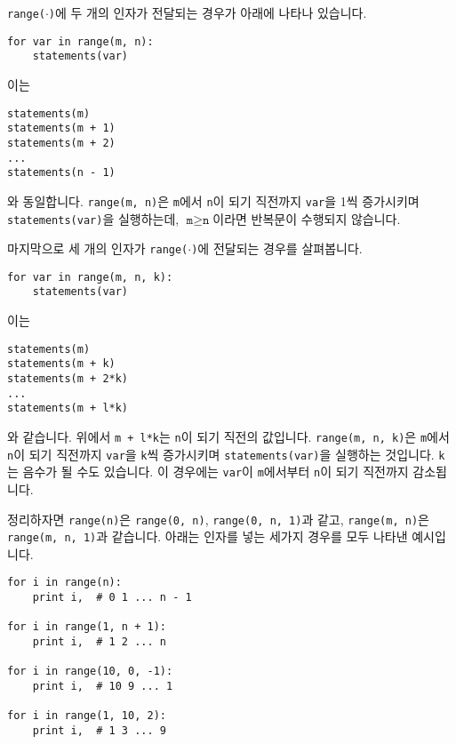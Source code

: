 \documentclass[../main.tex]{subfiles}
\begin{document}
\texttt{range($\cdot$)}에 두 개의 인자가 전달되는 경우가 아래에 나타나 있습니다.
\begin{verbatim}
for var in range(m, n):
	statements(var)
\end{verbatim}
이는 
\begin{verbatim}
statements(m)
statements(m + 1)
statements(m + 2)
...
statements(n - 1)
\end{verbatim}
와 동일합니다.
\texttt{range(m, n)}은 \texttt{m}에서 \texttt{n}이 되기 직전까지 \texttt{var}을 1씩 증가시키며 \texttt{statements(var)}을 실행하는데, $\texttt{m} \geq \texttt{n}$이라면 반복문이 수행되지 않습니다.

마지막으로 세 개의 인자가 \texttt{range($\cdot$)}에 전달되는 경우를 살펴봅니다.
\begin{verbatim}
for var in range(m, n, k):
	statements(var)
\end{verbatim}
이는
\begin{verbatim}
statements(m)
statements(m + k)
statements(m + 2*k)
...
statements(m + l*k)
\end{verbatim}
와 같습니다.
위에서 \texttt{m + l*k}는 \texttt{n}이 되기 직전의 값입니다.
\texttt{range(m, n, k)}은 \texttt{m}에서 \texttt{n}이 되기 직전까지 \texttt{var}을 \texttt{k}씩 증가시키며 \texttt{statements(var)}을 실행하는 것입니다.
\texttt{k}는 음수가 될 수도 있습니다.
이 경우에는 \texttt{var}이 \texttt{m}에서부터 \texttt{n}이 되기 직전까지 감소됩니다.

정리하자면 \texttt{range(n)}은 \texttt{range(0, n)}, \texttt{range(0, n, 1)}과 같고, \texttt{range(m, n)}은 \texttt{range(m, n, 1)}과 같습니다.
아래는 인자를 넣는 세가지 경우를 모두 나타낸 예시입니다.
\begin{verbatim}
for i in range(n):
	print i,  # 0 1 ... n - 1

for i in range(1, n + 1):
	print i,  # 1 2 ... n

for i in range(10, 0, -1):
	print i,  # 10 9 ... 1

for i in range(1, 10, 2):
	print i,  # 1 3 ... 9
\end{verbatim}
\end{document}
